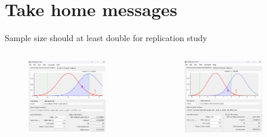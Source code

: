 \documentclass{beamer}
\begin{document}
	\section{Take home messages} 
		
	\begin{frame}{Sample size should at least double for replication study}	
		\begin{columns}
			\begin{figure}[H]
				\centering
				\includegraphics[width=0.8\textwidth]{pics/replilcatte power0.5.png}
			\end{figure}
			
			\begin{figure}[H]
				\centering
				\includegraphics[width=0.8\textwidth]{pics/replilcatte power0.8.png}
			\end{figure}
		\end{columns}	
		
	\end{frame}
	
\end{document}
